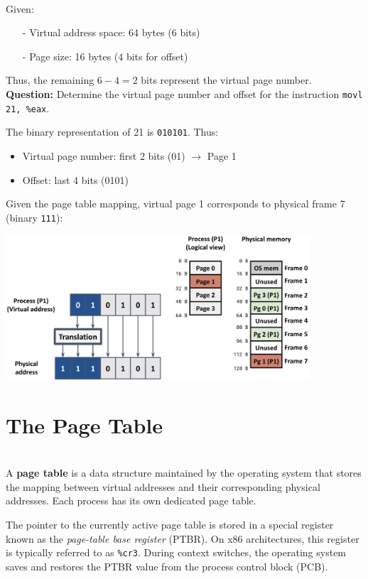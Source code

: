 \begin{example}
\leavevmode
\\[5px]
Given:
\begin{itemize}
  \item[-] Virtual address space: 64 bytes (6 bits)
  \item[-] Page size: 16 bytes (4 bits for offset)
\end{itemize}

Thus, the remaining $6 - 4 = 2$ bits represent the virtual page number.\\[5px]

\textbf{Question:} Determine the virtual page number and offset for the instruction \texttt{movl 21, \%eax}.

The binary representation of 21 is \texttt{010101}. Thus:
\begin{itemize}
  \item Virtual page number: first 2 bits (01) $\rightarrow$ Page 1
  \item Offset: last 4 bits (0101)
\end{itemize}

Given the page table mapping, virtual page 1 corresponds to physical frame 7 (binary \texttt{111}):

\begin{center}
  \includegraphics[width=0.85\textwidth]{chapters/L5/images/paging-example4.png}
\end{center}
\end{example}

\section{The Page Table}

\begin{definition}
\leavevmode
\\[2px]
A \textbf{page table} is a data structure maintained by the operating system that stores the mapping between virtual addresses and their corresponding physical addresses. Each process has its own dedicated page table.

The pointer to the currently active page table is stored in a special register known as the \textit{page-table base register} (PTBR). On x86 architectures, this register is typically referred to as \texttt{\%cr3}. During context switches, the operating system saves and restores the PTBR value from the process control block (PCB).
\end{definition}
